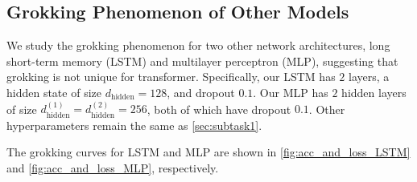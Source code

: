 \subsection{Grokking Phenomenon of Other Models}
\label{sec:subtask2}

We study the grokking phenomenon for two other network architectures, long short-term memory (LSTM) and multilayer perceptron (MLP), suggesting that grokking is not unique for transformer.
Specifically, our LSTM has $2$ layers, a hidden state of size $d_{\mathrm{hidden}} = 128$, and dropout $0.1$.
Our MLP has $2$ hidden layers of size $d_{\mathrm{hidden}}^{(1)} = d_{\mathrm{hidden}}^{(2)} = 256$, both of which have dropout $0.1$.
Other hyperparameters remain the same as \cref{sec:subtask1}.

The grokking curves for LSTM and MLP are shown in \cref{fig:acc_and_loss_LSTM} and \cref{fig:acc_and_loss_MLP}, respectively.

